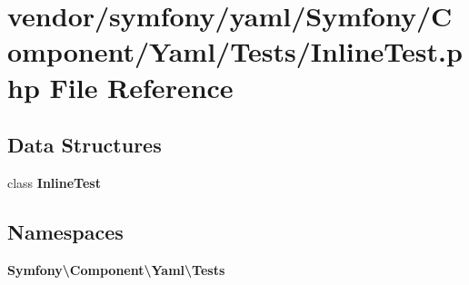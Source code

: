 \section{vendor/symfony/yaml/\+Symfony/\+Component/\+Yaml/\+Tests/\+Inline\+Test.php File Reference}
\label{_inline_test_8php}
\subsection*{Data Structures}
\begin{DoxyCompactItemize}
\item 
class {\bf Inline\+Test}
\end{DoxyCompactItemize}
\subsection*{Namespaces}
\begin{DoxyCompactItemize}
\item 
 {\bf Symfony\textbackslash{}\+Component\textbackslash{}\+Yaml\textbackslash{}\+Tests}
\end{DoxyCompactItemize}
